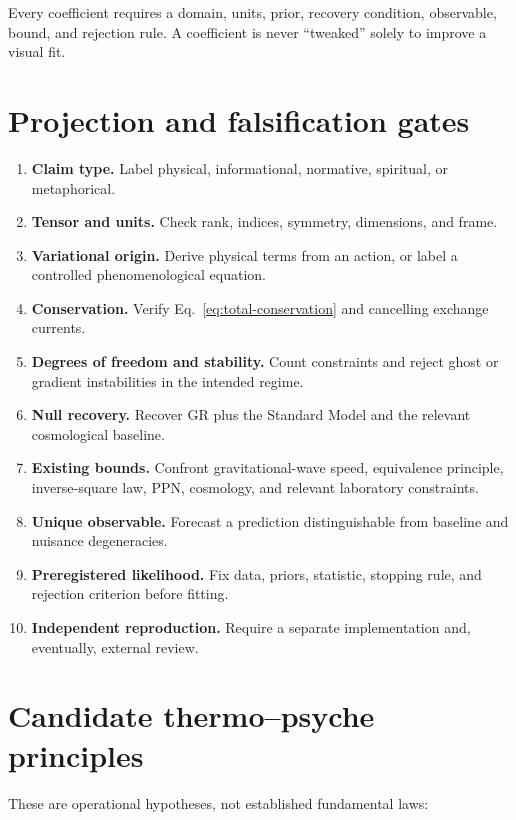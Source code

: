 \documentclass[11pt]{article}
\begin{document}
Every coefficient requires a domain, units, prior, recovery condition, observable, bound, and rejection rule. A coefficient is never ``tweaked'' solely to improve a visual fit.

\section{Projection and falsification gates}

\begin{enumerate}[label=G\arabic*.,leftmargin=0.55in]
\item \textbf{Claim type.} Label physical, informational, normative, spiritual, or metaphorical.
\item \textbf{Tensor and units.} Check rank, indices, symmetry, dimensions, and frame.
\item \textbf{Variational origin.} Derive physical terms from an action, or label a controlled phenomenological equation.
\item \textbf{Conservation.} Verify Eq.~\eqref{eq:total-conservation} and cancelling exchange currents.
\item \textbf{Degrees of freedom and stability.} Count constraints and reject ghost or gradient instabilities in the intended regime.
\item \textbf{Null recovery.} Recover GR plus the Standard Model and the relevant cosmological baseline.
\item \textbf{Existing bounds.} Confront gravitational-wave speed, equivalence principle, inverse-square law, PPN, cosmology, and relevant laboratory constraints.
\item \textbf{Unique observable.} Forecast a prediction distinguishable from baseline and nuisance degeneracies.
\item \textbf{Preregistered likelihood.} Fix data, priors, statistic, stopping rule, and rejection criterion before fitting.
\item \textbf{Independent reproduction.} Require a separate implementation and, eventually, external review.
\end{enumerate}

\section{Candidate thermo--psyche principles}

These are operational hypotheses, not established fundamental laws:
\end{document}
